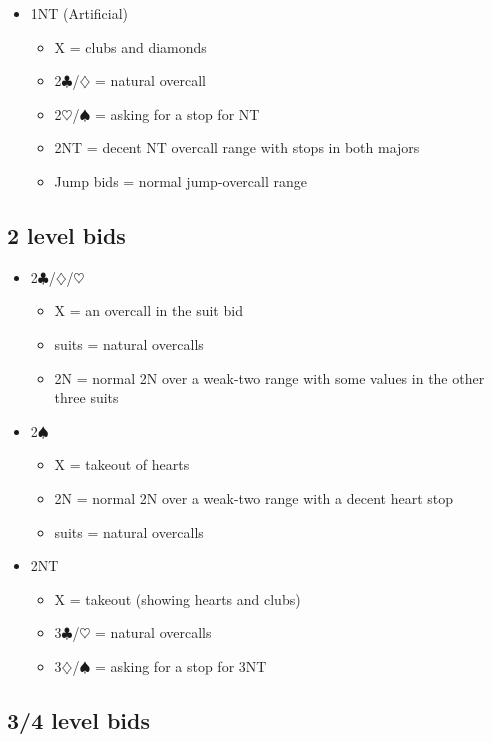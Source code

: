 \begin{itemize}
\item 1NT (Artificial)
	\begin{itemize}
	\item X = clubs and diamonds
	\item 2$\clubsuit$/$\diamondsuit$ = natural overcall
	\item 2$\heartsuit$/$\spadesuit$ = asking for a stop for NT
	\item 2NT = decent NT overcall range with stops in both majors
	\item Jump bids = normal jump-overcall range
	\end{itemize}
\end{itemize}

\subsection{2 level bids}

\begin{itemize}
\item 2$\clubsuit$/$\diamondsuit$/$\heartsuit$
	\begin{itemize}
	\item X = an overcall in the suit bid
	\item suits = natural overcalls
	\item 2N = normal 2N over a weak-two range with some values in the other three suits
	\end{itemize}
\item 2$\spadesuit$
	\begin{itemize}
	\item X = takeout of hearts
	\item 2N = normal 2N over a weak-two range with a decent heart stop
	\item suits = natural overcalls
	\end{itemize}
\item 2NT
	\begin{itemize}
	\item X = takeout (showing hearts and clubs)
	\item 3$\clubsuit$/$\heartsuit$ = natural overcalls
	\item 3$\diamondsuit$/$\spadesuit$ = asking for a stop for 3NT
	\end{itemize}
\end{itemize}

\subsection{3/4 level bids}

